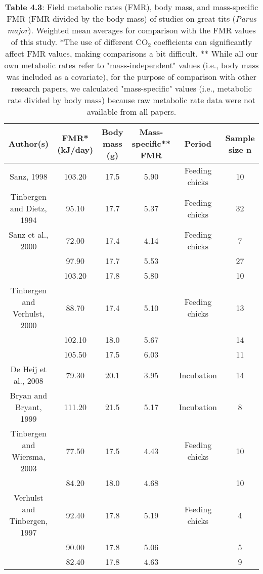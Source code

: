\documentclass[10pt, twoside]{book} %
\begin{document}
\clearpage

\begin{table}[!ht]
    \centering
\caption*{\textbf{Table 4.3}: Field metabolic rates (FMR), body mass, and mass-specific FMR (FMR divided by the body mass) of studies on great tits (\textit{Parus major}). Weighted mean averages for comparison with the FMR values of this study. *The use of different CO$_{\text{2}}$ coefficients can significantly affect FMR values, making comparisons a bit difficult. ** While all our own metabolic rates refer to "mass-independent" values (i.e., body mass was included as a covariate), for the purpose of comparison with other research papers, we calculated "mass-specific" values (i.e., metabolic rate divided by body mass) because raw metabolic rate data were not available from all papers.}
\begin{adjustbox}{max width=\textwidth}    
    \begin{tabular}{cccccc}
    \hline
        Author(s) & FMR* (kJ/day) & Body mass (g) & Mass-specific** FMR & Period & Sample size n \\ \hline
        Sanz, 1998 & 103.20 & 17.5 & 5.90 & Feeding chicks & 10 \\ 
        Tinbergen and Dietz, 1994 & 95.10 & 17.7 & 5.37 & Feeding chicks & 32 \\ 
        Sanz et al., 2000 & 72.00 & 17.4 & 4.14 & Feeding chicks & 7 \\ 
        ~ & 97.90 & 17.7 & 5.53 & ~ & 27 \\ 
        ~ & 103.20 & 17.8 & 5.80 & ~ & 10 \\ 
        Tinbergen and Verhulst, 2000 & 88.70 & 17.4 & 5.10 & Feeding chicks & 13 \\ 
        ~ & 102.10 & 18.0 & 5.67 & ~ & 14 \\ 
        ~ & 105.50 & 17.5 & 6.03 & ~ & 11 \\ 
        De Heij et al., 2008 & 79.30 & 20.1 & 3.95 & Incubation & 14 \\ 
        Bryan and Bryant, 1999 & 111.20 & 21.5 & 5.17 & Incubation & 8 \\ 
        Tinbergen and Wiersma, 2003 & 77.50 & 17.5 & 4.43 & Feeding chicks & 10 \\ 
        ~ & 84.20 & 18.0 & 4.68 & ~ & 10 \\ 
        Verhulst and Tinbergen, 1997 & 92.40 & 17.8 & 5.19 & Feeding chicks & 4 \\ 
        ~ & 90.00 & 17.8 & 5.06 & ~ & 5 \\ 
        ~ & 82.40 & 17.8 & 4.63 & ~ & 9 \\ 

\end{tabular}
\end{adjustbox}
\end{table}
\end{document}
